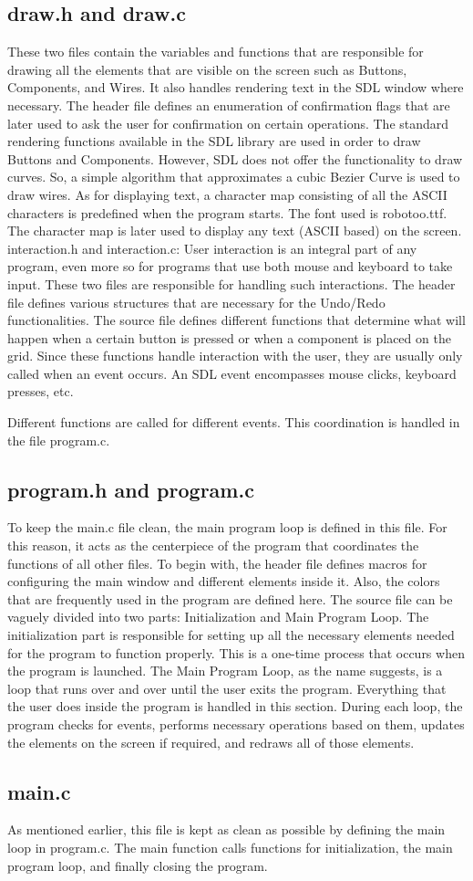 \documentclass[report]{subfiles}
\begin{document}
\subsection{draw.h and draw.c}
    These two files contain the variables and functions that are
    responsible for drawing all the elements that are visible on the
    screen such as Buttons, Components, and Wires. It also handles
    rendering text in the SDL window where necessary. The header
    file defines an enumeration of confirmation flags that are later used
    to ask the user for confirmation on certain operations.
    The standard rendering functions available in the SDL library are
    used in order to draw Buttons and Components. However, SDL
    does not offer the functionality to draw curves. So, a simple
    algorithm that approximates a cubic Bezier Curve is used to draw
    wires.
    As for displaying text, a character map consisting of all the ASCII
    characters is predefined when the program starts. The font used is
    robotoo.ttf. The character map is later used to display any text
    (ASCII based) on the screen.
    interaction.h and interaction.c:
    User interaction is an integral part of any program, even more so
    for programs that use both mouse and keyboard to take input.
    These two files are responsible for handling such interactions. The
    header file defines various structures that are necessary for the
    Undo/Redo functionalities.
    The source file defines different functions that determine what will
    happen when a certain button is pressed or when a component is
    placed on the grid. Since these functions handle interaction with
    the user, they are usually only called when an event occurs. An
    SDL event encompasses mouse clicks, keyboard presses, etc.

    Different functions are called for different events. This
    coordination is handled in the file program.c.
\subsection{program.h and program.c}
    To keep the main.c file clean, the main program loop is defined in
    this file. For this reason, it acts as the centerpiece of the program
    that coordinates the functions of all other files. To begin with, the
    header file defines macros for configuring the main window and
    different elements inside it. Also, the colors that are frequently
    used in the program are defined here.
    The source file can be vaguely divided into two parts:
    Initialization and Main Program Loop. The initialization part is
    responsible for setting up all the necessary elements needed for the
    program to function properly. This is a one-time process that
    occurs when the program is launched.
    The Main Program Loop, as the name suggests, is a loop that runs
    over and over until the user exits the program. Everything that the
    user does inside the program is handled in this section. During
    each loop, the program checks for events, performs necessary
    operations based on them, updates the elements on the screen if
    required, and redraws all of those elements.
\subsection{main.c}
    As mentioned earlier, this file is kept as clean as possible by
    defining the main loop in program.c. The main function calls functions for initialization, the main
    program loop, and finally closing the program.
\end{document}

